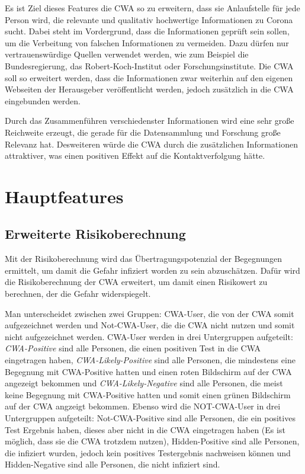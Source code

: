 \documentclass[conference]{IEEEtran}
\begin{document}
Es ist Ziel dieses Features die CWA so zu erweitern, dass sie Anlaufstelle für jede Person wird, die relevante und qualitativ hochwertige Informationen zu Corona sucht.
Dabei steht im Vordergrund, dass die Informationen geprüft sein sollen, um die Verbeitung von falschen Informationen zu vermeiden. 
Dazu dürfen nur vertrauenswürdige Quellen verwendet werden, wie zum Beispiel die Bundesregierung, das Robert-Koch-Institut oder Forschungsinstitute. 
Die CWA soll so erweitert werden, dass die Informationen zwar weiterhin auf den eigenen Webseiten der Herausgeber veröffentlicht werden, jedoch zusätzlich in die CWA eingebunden werden.

Durch das Zusammenführen verschiedenster Informationen wird eine sehr große Reichweite erzeugt, die gerade für die Datensammlung und Forschung große Relevanz hat.
Desweiteren würde die CWA durch die zusätzlichen Informationen attraktiver, was einen positiven Effekt auf die Kontaktverfolgung hätte.\\

\section{Hauptfeatures} \label{Hauptfeatures}
\subsection{Erweiterte Risikoberechnung}
Mit der Risikoberechnung wird das Übertragungspotenzial der Begegnungen ermittelt,
um damit die Gefahr infiziert worden zu sein abzuschätzen.
Dafür wird die Risikoberechnung der CWA erweitert, 
um damit einen Risikowert zu berechnen, der die Gefahr widerspiegelt.

Man unterscheidet zwischen zwei Gruppen: CWA-User, die von der CWA somit aufgezeichnet werden und Not-CWA-User, 
die die CWA nicht nutzen und somit nicht aufgezeichnet werden. 
CWA-User werden in drei Untergruppen aufgeteilt: 
\textit{CWA-Positive} sind alle Personen, die einen positiven Test in die CWA eingetragen haben,
\textit{CWA-Likely-Positive} sind alle Personen, die mindestens eine Begegnung mit CWA-Positive hatten und einen roten Bildschirm auf der CWA angezeigt bekommen und
\textit{CWA-Likely-Negative} sind alle Personen, die meist keine Begegnung mit CWA-Positive hatten und somit einen grünen Bildschirm auf der CWA angzeigt bekommen.
Ebenso wird die NOT-CWA-User in drei Untergruppen aufgeteilt: Not-CWA-Positive sind alle Personen, die ein positives Test Ergebnis haben, 
dieses aber nicht in die CWA eingetragen haben (Es ist möglich, dass sie die CWA trotzdem nutzen), Hidden-Positive sind alle Personen, die infiziert wurden, 
jedoch kein positives Testergebnis nachweisen können und Hidden-Negative sind alle Personen, die nicht infiziert sind.
\end{document}
